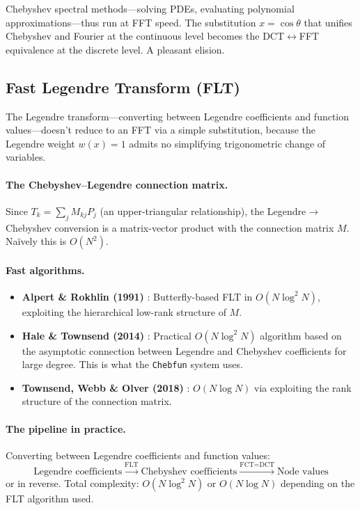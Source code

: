 \documentclass[12pt,a4paper]{report}
\theoremstyle{thms}
\theoremstyle{defns}
\begin{document}
Chebyshev spectral methods—solving PDEs, evaluating polynomial approximations—thus run at FFT speed. The substitution $x = \cos\theta$ that unifies Chebyshev and Fourier at the continuous level becomes the DCT$\leftrightarrow$FFT equivalence at the discrete level. A pleasant elision.

\subsection{Fast Legendre Transform (FLT)}

The Legendre transform—converting between Legendre coefficients and function values—doesn't reduce to an FFT via a simple substitution, because the Legendre weight $w(x) = 1$ admits no simplifying trigonometric change of variables.

\paragraph{The Chebyshev--Legendre connection matrix.} Since $T_k = \sum_j M_{kj} P_j$ (an upper-triangular relationship), the Legendre$\to$Chebyshev conversion is a matrix-vector product with the connection matrix $M$. Na\"ively this is $O(N^2)$.

\paragraph{Fast algorithms.}
\begin{itemize}
    \item \textbf{Alpert \& Rokhlin (1991)} \cite{alpert_rokhlin}: Butterfly-based FLT in $O(N \log^2 N)$, exploiting the hierarchical low-rank structure of $M$.
    \item \textbf{Hale \& Townsend (2014)} \cite{hale_townsend}: Practical $O(N\log^2 N)$ algorithm based on the asymptotic connection between Legendre and Chebyshev coefficients for large degree. This is what the \texttt{Chebfun} system uses.
    \item \textbf{Townsend, Webb \& Olver (2018)} \cite{townsend_webb_olver}: $O(N \log N)$ via exploiting the rank structure of the connection matrix.
\end{itemize}

\paragraph{The pipeline in practice.} Converting between Legendre coefficients and function values:
\begin{equation}
    \text{Legendre coefficients} \xrightarrow{\text{FLT}} \text{Chebyshev coefficients} \xrightarrow{\text{FCT} = \text{DCT}} \text{Node values}
\end{equation}
or in reverse. Total complexity: $O(N \log^2 N)$ or $O(N \log N)$ depending on the FLT algorithm used.
\end{document}
